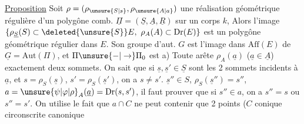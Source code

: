 \uline{Proposition} Soit $\rho=(\rho_{\unsure{S|s}},\rho_{\unsure{A|a}})$ une réalisation géométrique régulière d'un polygône comb. $\underline{\Pi}=(\underline S,\underline A,\underline R)$ sur un corps $k$,  Alors l'image $\{\rho_{\underline S}(S)\subset\deleted{\unsure{S}}E,\ \rho_A(A)\subset\mathrm{Dr}(E)\}$ est un polygône géométrique  régulier dans $E$.
Son groupe d'aut. $G$ est l'image dans $\mathrm{Aff}(E)$ de $\underline G=\mathrm{Aut}(\Pi)$, et $\Pi\unsure{-|\to}\Pi_0$ est 
a) Toute arête $\rho_A(\underline a)$ ($\underline a\in\underline A$)  exactement deux sommets. On sait que si $\underline s,\underline{s}'\in\underline S$ sont les 2 sommets incidents à $\underline a$, et $s=\rho_S(\underline s)$, $s'=\rho_S(\underline{s}')$, on a $s\ne s'$.
  $\underline{s}''\in S$,  $\rho_S(\underline{s}'')=s''$,  $a=\unsure{\psi|\varphi|\rho}_A(\underline a)=\mathrm{Dr}(s,s')$, il faut prouver que si $s''\in a$, on a $s''=s$ ou $s''=s'$. On utilise le fait que $a\cap C$ ne peut contenir que 2 points ($C$ conique circonscrite canonique \unsure{\dots)|\dots}
